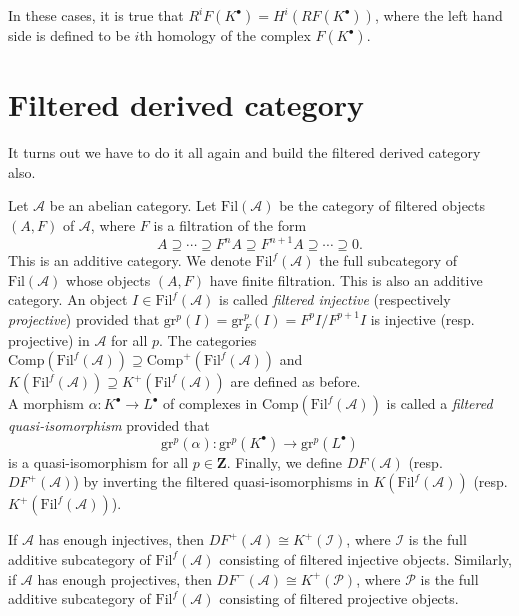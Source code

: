 \begin{remark}
\label{remark-cohomology-of-derived-functor}
In these cases, it is true that $R^iF(K^\bullet) = H^i(RF(K^\bullet))$, where
the left hand side is defined to be $i$th homology of the complex
$F(K^\bullet)$.
\end{remark}




\section{Filtered derived category}
\label{section-filtered-derived-category}

\noindent
It turns out we have to do it all again and build the filtered derived
category also.

\begin{definition}
\label{definition-filtered}
Let $\mathcal{A}$ be an abelian category. Let $\text{Fil}(\mathcal{A})$ be the
category of filtered objects $(A,F)$ of $\mathcal{A}$, where $F$ is a
filtration of the form
$$
A \supseteq \cdots \supseteq F^n A \supseteq F^{n+1}A \supseteq \cdots
\supseteq 0.
$$
This is an additive category. We denote $\text{Fil}^f(\mathcal{A})$ the full
subcategory of $\text{Fil}(\mathcal{A})$ whose objects $(A,F)$ have finite
filtration. This is also an additive category. An object $I \in
\text{Fil}^f(\mathcal{A})$ is called {\it filtered injective} (respectively
{\it projective}) provided that $\text{gr}^p(I) = \text{gr}_F^p(I) =
F^pI/F^{p+1}I$ is injective (resp. projective) in $\mathcal{A}$ for all $p$.
The categories $\text{Comp}(\text{Fil}^f(\mathcal{A})) \supseteq
\text{Comp}^+(\text{Fil}^f(\mathcal{A}))$ and $K(\text{Fil}^f(\mathcal{A}))
\supseteq K^+(\text{Fil}^f(\mathcal A))$ are defined as before.
\\
A morphism $\alpha : K^\bullet \to L^\bullet$ of complexes in
$\text{Comp}(\text{Fil}^f(\mathcal{A}))$ is called a {\it filtered
quasi-isomorphism} provided that
$$
\mathrm{gr}^p(\alpha): \mathrm{gr}^p(K^\bullet) \to \mathrm{gr}^p(L^\bullet)
$$
is a quasi-isomorphism for all $p \in \mathbf{Z}$. Finally, we define $D
F(\mathcal{A})$ (resp. $D F^+(\mathcal{A})$) by inverting the filtered
quasi-isomorphisms in $K(\text{Fil}^f(\mathcal{A}))$ (resp.
$K^+(\text{Fil}^f(\mathcal{A}))$).
\end{definition}

\begin{lemma}
\label{lemma-filtered-derived-category}
If $\mathcal{A}$ has enough injectives, then $D F^+(\mathcal{A}) \cong
K^+(\mathcal{I})$, where $\mathcal{I}$ is the full additive subcategory of
$\text{Fil}^f(\mathcal{A})$ consisting of filtered injective objects.
Similarly, if $\mathcal{A}$ has enough projectives, then $D F^-(\mathcal{A})
\cong K^+(\mathcal{P})$, where $\mathcal P$ is the full additive subcategory of
$\text{Fil}^f(\mathcal{A})$ consisting of filtered projective objects.
\end{lemma}

